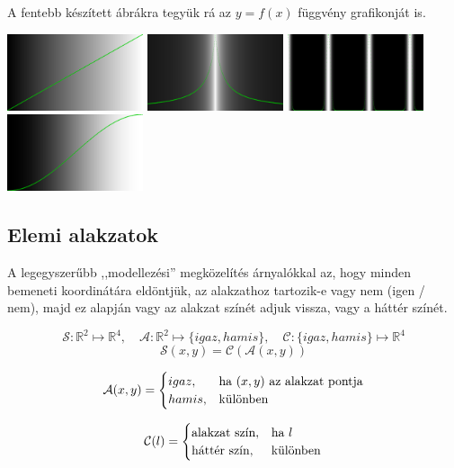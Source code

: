 A fentebb készített ábrákra tegyük rá az $y=f(x)$ függvény grafikonját is.

\begin{center}
\includegraphics[width=4cm]{images/f01.png}\hfill
\includegraphics[width=4cm]{images/f02.png}\hfill
\includegraphics[width=4cm]{images/f03.png}\hfill
\includegraphics[width=4cm]{images/f04.png}
\end{center}

\subsection{Elemi alakzatok}

A legegyszerűbb ,,modellezési'' megközelítés árnyalókkal az, hogy minden bemeneti koordinátára
eldöntjük, az alakzathoz tartozik-e vagy nem (igen / nem), majd ez alapján vagy az
alakzat színét adjuk vissza, vagy a háttér színét.

\begin{tcolorbox}
  
  $$
  \mathcal{S}: \mathbb{R}^2 \mapsto \mathbb{R}^4,\quad
  \mathcal{A}: \mathbb{R}^2 \mapsto \{igaz, hamis\},\quad
  \mathcal{C}: \{igaz, hamis\} \mapsto \mathbb{R}^4
  $$
  $$\mathcal{S}(x, y) = \mathcal{C}(\mathcal{A}(x,y))$$

  $$\mathcal{A}(x,y) = 
    \begin{cases}
      igaz,  &\text{ha~} (x, y) \text{~az alakzat pontja}\cr
      hamis, &\text{különben}
    \end{cases}
  $$

  $$\mathcal{C}(l) = 
    \begin{cases}
      \text{alakzat szín},  &\text{ha~} l\cr
      \text{háttér szín}, &\text{különben}
    \end{cases}
  $$

  \end{tcolorbox}

